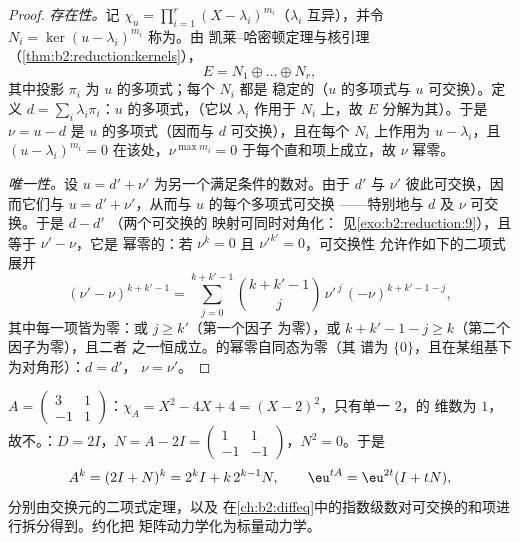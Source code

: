 \begin{proof}
\emph{存在性。}记 $\chi_u = \prod_{i=1}^{r} (X -
\lambda_i)^{m_i}$（$\lambda_i$ 互异），并令 $N_i = \ker(u -
\lambda_i)^{m_i}$ 称为\emph{}。由
凯莱–哈密顿定理与核引理
（\cref{thm:b2:reduction:kernels}），
\[
E = N_1 \oplus \dots \oplus N_r ,
\]
其中投影 $\pi_i$ 为 $u$ 的多项式；每个 $N_i$ 都是
稳定的（$u$ 的多项式与 $u$ 可交换）。定义 $d = \sum_i \lambda_i
\pi_i$：$u$ 的多项式，（它以 $\lambda_i$
作用于 $N_i$ 上，故 $E$ 分解为其）。于是 $\nu = u -
d$ 是 $u$ 的多项式（因而与 $d$ 可交换），且在每个
$N_i$ 上作用为 $u - \lambda_i$，且 $(u - \lambda_i)^{m_i} = 0$
在该处，$\nu^{\max m_i} = 0$ 于每个直和项上成立，故 $\nu$ 幂零。

\emph{唯一性。}设 $u = d' + \nu'$ 为另一个满足条件的数对。由于
$d'$ 与 $\nu'$ 彼此可交换，因而它们与 $u = d' +
\nu'$，从而与 $u$ 的每个多项式可交换 ——特别地与 $d$
及 $\nu$ 可交换。于是 $d - d'$ （两个可交换的
映射可同时对角化：
见\cref{exo:b2:reduction:9}），且等于 $\nu' - \nu$，它是
幂零的：若 $\nu^k = 0$ 且 $\nu'^{k'} = 0$，可交换性
允许作如下的二项式展开
\[
(\nu' - \nu)^{k + k' - 1}
= \sum_{j=0}^{k+k'-1}\binom{k + k' - 1}{j}
\,\nu'^{\,j}\,(-\nu)^{k + k' - 1 - j} ,
\]
其中每一项皆为零：或 $j \geq k'$（第一个因子
为零），或 $k + k' - 1 - j \geq k$（第二个因子为零），且二者
之一恒成立。的幂零自同态为零（其
谱为 $\{0\}$，且在某组基下为对角形）：$d = d'$，
$\nu = \nu'$。
\end{proof}

\begin{example}[幂与指数]\label{ex:b2:reduction:powers}
$A = \begin{pmatrix} 3 & 1\\ -1 & 1\end{pmatrix}$：$\chi_A = X^2 -
4X + 4 = (X-2)^2$，只有单一 $2$，的
维数为 $1$，故不。：$D = 2I$，$N = A - 2I =
\begin{pmatrix} 1 & 1\\ -1 & -1\end{pmatrix}$，$N^2 = 0$。于是
\[
A^k = (2I + N)^k = 2^k I + k\,2^{k-1} N ,
\qquad
\eu^{tA} = \eu^{2t}(I + tN),
\]
分别由交换元的二项式定理，以及
在\cref{ch:b2:diffeq}中的指数级数对可交换的和项进行拆分得到。约化把
矩阵动力学化为标量动力学。
\end{example}

